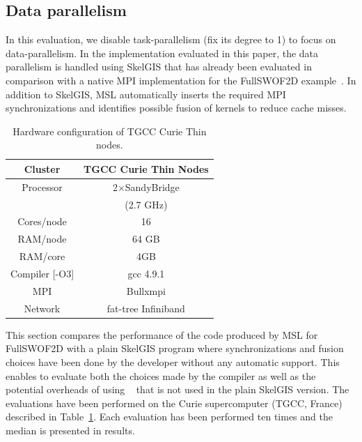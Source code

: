 \subsection{Data parallelism}

In this evaluation, we disable task-parallelism (fix its degree to 1) to focus on data-parallelism.
In the implementation evaluated in this paper, the data parallelism is handled using SkelGIS that has already been evaluated in comparison with a native MPI implementation for the FullSWOF2D example~\cite{CPE:CPE3494}.
In addition to SkelGIS, MSL automatically inserts the required MPI synchronizations and identifies possible fusion of kernels to reduce cache misses.

\begin{table}[!ht]
\begin{center}
 \begin{tabular}{|c|c|}
   \hline
    Cluster & \textbf{TGCC Curie Thin Nodes}\\
     \hline         
    Processor & 2$\times$SandyBridge\\
    & (2.7 GHz)\\
    Cores/node & 16 \\
    RAM/node & 64 GB\\
    RAM/core & 4GB\\
    Compiler [-O3] & gcc 4.9.1\\
    MPI & Bullxmpi\\
    Network & fat-tree Infiniband\\
    \hline
 \end{tabular}
 \caption{\label{tab:TGCC}Hardware configuration of TGCC Curie Thin nodes.}
 \end{center}
\end{table}

This section compares the performance of the code produced by MSL for FullSWOF2D with a plain SkelGIS program where synchronizations and fusion choices have been done by the developer without any automatic support.
This enables to evaluate both the choices made by the compiler as well as the potential overheads of using \llc~\cite{l2c} that is not used in the plain SkelGIS version.
The evaluations have been performed on the Curie supercomputer (TGCC, France) described in Table~\ref{tab:TGCC}.
Each evaluation has been performed ten times and the median is presented in results.


